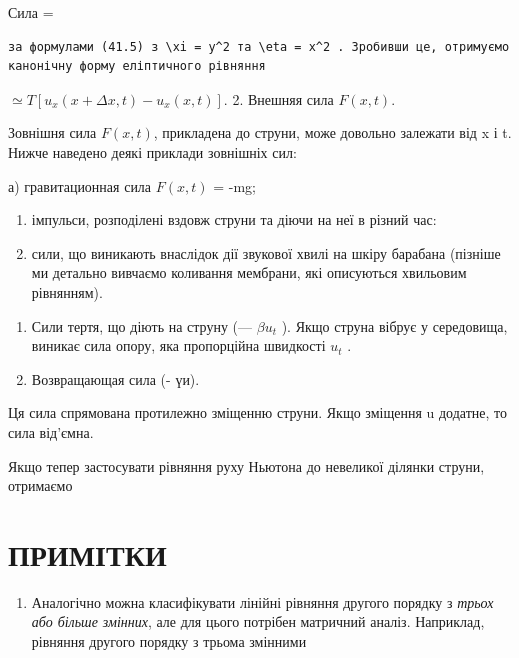 \documentclass[
  ukrainian,
]{article}
\providecommand{\tightlist}{%
  \setlength{\itemsep}{0pt}\setlength{\parskip}{0pt}}
\begin{document}
Сила =

\begin{verbatim}
за формулами (41.5) з \xi = y^2 та \eta = x^2 . Зробивши це, отримуємо канонічну форму еліптичного рівняння
\end{verbatim}

\(\simeq T [u_x(x + \Delta x, t) - u_x(x, t)].\) 2. Внешняя сила
\(F (x, t)\).

Зовнішня сила \(F(x, t)\), прикладена до струни, може довольно залежати
від x і t. Нижче наведено деякі приклади зовнішніх сил:

а) гравитационная сила \(F(x, t)\) = -mg;

\begin{enumerate}
\def\labelenumi{\alph{enumi})}
\setcounter{enumi}{1}
\item
  імпульси, розподілені вздовж струни та діючи на неї в різний час:
\item
  сили, що виникають внаслідок дії звукової хвилі на шкіру барабана
  (пізніше ми детально вивчаємо коливання мембрани, які описуються
  хвильовим рівнянням).
\end{enumerate}

\begin{enumerate}
\def\labelenumi{\arabic{enumi}.}
\setcounter{enumi}{2}
\item
  Сили тертя, що діють на струну (--- \(\beta u_t\) ). Якщо струна
  вібрує у середовища, виникає сила опору, яка пропорційна швидкості
  \(u_t\) .
\item
  Возвращающая сила (- үи).
\end{enumerate}

Ця сила спрямована протилежно зміщенню струни. Якщо зміщення u додатне,
то сила від'ємна.

Якщо тепер застосувати рівняння руху Ньютона до невеликої ділянки
струни, отримаємо

\section{ПРИМІТКИ}\label{ux43fux440ux438ux43cux456ux442ux43aux438-1}

\begin{enumerate}
\def\labelenumi{\arabic{enumi}.}
\tightlist
\item
  Аналогічно можна класифікувати лінійні рівняння другого порядку з
  \emph{трьох або більше змінних}, але для цього потрібен матричний
  аналіз. Наприклад, рівняння другого порядку з трьома змінними
\end{enumerate}
\end{document}
